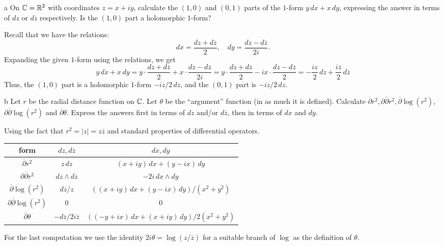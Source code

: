 \documentclass{lkx_pset}
\begin{document}
\begin{parts}
	\begin{part}{a}
		On $\mathbb{C} = \mathbb{R}^2$ with coordinates $z=x+iy$, calculate the $(1,0)$ and $(0,1)$ parts of the $1$-form $y\,dx + x\,dy$, expressing the answer in terms of $dz$ or $d\overline{z}$ respectively. Is the $(1,0)$ part a holomorphic $1$-form?
	\end{part}

	Recall that we have the relations:
	\[
		dx = \frac{dz+d\overline{z}}{2},\quad dy = \frac{dz - d\overline{z}}{2i}.
	\]
	Expanding the given $1$-form using the relations, we get
	\[
		y\,dx + x\,dy = y\cdot\frac{dz+d\overline{z}}{2} + x\cdot\frac{dz-d\overline{z}}{2i}
		=y\cdot \frac{dz+d\overline{z}}{2} - ix\cdot\frac{dz-d\overline{z}}{2} = -\frac{iz}{2}\,dz +\frac{i\overline{z}}{2}\,d\overline{z}
	\]
	Thus, the $(1,0)$ part is a holomorphic $1$-form $-iz/2\,dz$, and the $(0,1)$ part is $-iz/2\,dz$.

	\begin{part}{b}
		Let $r$ be the radial distance function on $\mathbb{C}$. Let $\theta$ be the ``argument'' function (in as much it is defined). Calculate $\overline{\partial} r^2, \partial\overline{\partial} r^2, \overline{\partial}\log(r^2)$, $\partial\overline{\partial} \log(r^2)$ and $\overline{\partial}\theta$. Express the answers first in terms of $dz$ and/or $d\overline{z}$, then in terms of $dx$ and $dy$.
	\end{part}

	Using the fact that $r^2 = |z|=z\overline{z}$ and standard properties of differential operators.
	\begin{center}
		\renewcommand*{\arraystretch}{1.2}
		\begin{tabular}{|c|c|c|}
			\hline
			\textrm{form}                            & $dz,d\overline{z}$              & $dx,dy$                               \\
			\hline
			$\overline{\partial} r^2$                & $z\,dz$                         & $(x+iy)\,dx + (y-ix)\,dy$             \\
			$\partial\overline{\partial} r^2$        & $dz\wedge d\overline{z}$        & $-2i\,dx\wedge dy$                    \\
			$\overline{\partial} \log(r^2)$          & $d\overline{z}/z$               & $((x+iy)\,dx + (y-ix)\,dy)/(x^2+y^2)$ \\
			$\partial \overline{\partial} \log(r^2)$ & $0$                             & $0$                                   \\
			$\overline{\partial} \theta$             & $-d\overline{z}/2i\overline{z}$ & $((-y+ix)\,dx+(x+iy)\,dy)/2(x^2+y^2)$ \\
			\hline
		\end{tabular}
	\end{center}
	For the last computation we use the identity $2i\theta = \log(z/\overline{z})$ for a suitable branch of $\log$ as the definition of $\theta$.

\end{parts}
\end{document}

